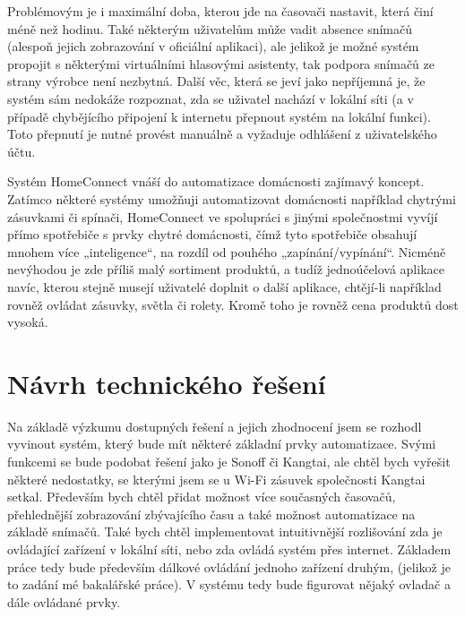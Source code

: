Problémovým je i maximální doba, kterou jde na časovači nastavit, která činí méně než hodinu. Také některým uživatelům může vadit absence snímačů (alespoň jejich zobrazování v oficiální aplikaci), ale jelikož je možné systém propojit s některými virtuálními hlasovými asistenty, tak podpora snímačů ze strany výrobce není nezbytná. Další věc, která se jeví jako nepříjemná je, že systém sám nedokáže rozpoznat, zda se uživatel nachází v lokální síti (a v případě chybějícího připojení k internetu přepnout systém na lokální funkci). Toto přepnutí je nutné provést manuálně a vyžaduje odhlášení z uživatelského účtu.

Systém HomeConnect vnáší do automatizace domácnosti zajímavý koncept. Zatímco některé systémy umožňuji automatizovat domácnosti například chytrými zásuvkami či spínači, HomeConnect ve spolupráci s jinými společnostmi vyvíjí přímo spotřebiče s prvky chytré domácnosti, čímž tyto spotřebiče obsahují mnohem více „inteligence“, na rozdíl od pouhého „zapínání/vypínání“. Nicméně nevýhodou je zde příliš malý sortiment produktů, a tudíž jednoúčelová aplikace navíc, kterou stejně musejí uživatelé doplnit o další aplikace, chtějí-li například rovněž ovládat zásuvky, světla či rolety. Kromě toho je rovněž cena produktů dost vysoká.

\section{Návrh technického řešení}
Na základě výzkumu dostupných řešení a jejich zhodnocení jsem se rozhodl vyvinout systém, který bude mít některé základní prvky automatizace. Svými funkcemi se bude podobat řešení jako je Sonoff či Kangtai, ale chtěl bych vyřešit některé nedostatky, se kterými jsem se u Wi-Fi zásuvek společnosti Kangtai setkal. Především bych chtěl přidat možnost více současných časovačů, přehlednější zobrazování zbývajícího času a také možnost automatizace na základě snímačů. Také bych chtěl implementovat intuitivnější rozlišování zda je ovládající zařízení v lokální síti, nebo zda ovládá systém přes internet. 
Základem práce tedy bude především dálkové ovládání jednoho zařízení druhým, (jelikož je to zadání mé bakalářské práce). V systému tedy bude figurovat nějaký ovladač a dále ovládané prvky. 

